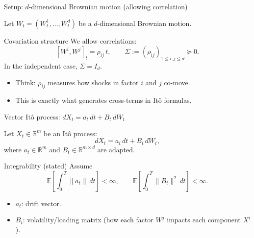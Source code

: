 \documentclass[10pt,aspectratio=169]{beamer}
\newcommand{\R}{\mathbb{R}}
\newcommand{\E}{\mathbb{E}}
\begin{document}
\begin{frame}{Setup: $d$-dimensional Brownian motion (allowing correlation)}

Let $W_t=(W_t^1,\dots,W_t^d)$ be a $d$-dimensional Brownian motion.\pause

\medskip
\begin{block}{Covariation structure}
We allow correlations:
\[
[W^i,W^j]_t = \rho_{ij}\,t,
\qquad
\Sigma := (\rho_{ij})_{1\le i,j\le d}\succeq 0.
\]
In the independent case, $\Sigma=I_d$.\pause
\end{block}

\begin{itemize}
  \item Think: $\rho_{ij}$ measures how shocks in factor $i$ and $j$ co-move.\pause
  \item This is exactly what generates cross-terms in It\^o formulas.
\end{itemize}

\end{frame}

\begin{frame}{Vector It\^o process: $dX_t = a_t\,dt + B_t\,dW_t$}

Let $X_t\in\R^m$ be an It\^o process:\pause
\[
dX_t = a_t\,dt + B_t\,dW_t,
\]
where $a_t\in\R^m$ and $B_t\in\R^{m\times d}$ are adapted.\pause

\medskip
\begin{block}{Integrability (stated)}
Assume
\[
\E\!\left[\int_0^T \|a_t\|\,dt\right] <\infty,
\qquad
\E\!\left[\int_0^T \|B_t\|^2\,dt\right] <\infty.
\]
\end{block}\pause

\begin{itemize}
  \item $a_t$: drift vector.\pause
  \item $B_t$: volatility/loading matrix (how each factor $W^j$ impacts each component $X^i$).
\end{itemize}

\end{frame}
\end{document}

